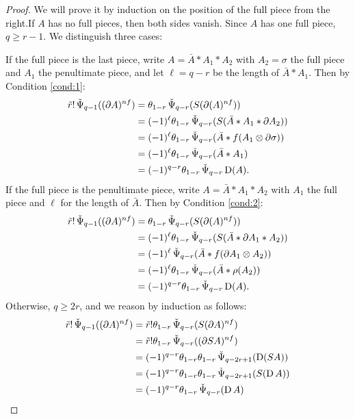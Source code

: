 \begin{proof}
	We will prove it by induction on the position of the full piece from the right.If $A$ has no full pieces, then both sides vanish. Since $A$ has one full piece, $q\geq r-1$. We distinguish three cases:

	If the full piece is the last piece, write $A=\bar{A}*A_1*A_2$ with $A_2 = \sigma$ the full piece and $A_1$ the penultimate piece, and let $\ell = q-r$ be the length of $\bar{A}*A_1$. Then by Condition \eqref{cond:1}:
	\begin{align*}
		\tilde{r}!\operatorname{\check{\Psi}}_{q-1}((\partial A)^{nf}) &=
		\theta_{1-r} \operatorname{\check{\Psi}}_{q-r}(S(\partial(A)^{nf})) \\
		&= (-1)^{\ell} \theta_{1-r}\operatorname{\check{\Psi}}_{q-r}(S(\bar{A}*A_1*\partial A_2)) \\
		&= (-1)^{\ell} \theta_{1-r}\operatorname{\check{\Psi}}_{q-r}(\bar{A}*f(A_1\otimes \partial \sigma)) \\
		&= (-1)^{\ell} \theta_{1-r}\operatorname{\check{\Psi}}_{q-r}(\bar{A}*A_1) \\
		&= (-1)^{q-r}\theta_{1-r}\operatorname{\check{\Psi}}_{q-r}\operatorname{D}(A).
	\end{align*}
	If the full piece is the penultimate piece, write $A=\bar{A}*A_1*A_2$ with $A_1$ the full piece and $\ell$ for the length of $\bar{A}$. Then by Condition \eqref{cond:2}:
	\begin{align*}
		\tilde{r}!\operatorname{\check{\Psi}}_{q-1}((\partial A)^{nf}) &=
		\theta_{1-r}\operatorname{\check{\Psi}}_{q-r}(S(\partial(A)^{nf})) \\
		&= (-1)^{\ell}\theta_{1-r}\operatorname{\check{\Psi}}_{q-r}(S(\bar{A}*\partial A_1* A_2)) \\
		&= (-1)^{\ell} \operatorname{\check{\Psi}}_{q-r}(\bar{A}*f(\partial A_1\otimes A_2)) \\
		&= (-1)^{\ell} \theta_{1-r}\operatorname{\check{\Psi}}_{q-r}(\bar{A}*\rho(A_2)) \\
		&= (-1)^{q-r}\theta_{1-r}\operatorname{\check{\Psi}}_{q-r}\operatorname{D}(A).
	\end{align*}
	Otherwise, $q\geq 2r$, and we reason by induction as follows: %
	\begin{align*}
		\tilde{r}!\operatorname{\check{\Psi}}_{q-1}((\partial A)^{nf})
		&= \tilde{r}!\theta_{1-r} \operatorname{\check{\Psi}}_{q-r}(S(\partial A)^{nf}) \\
		&= \tilde{r}!\theta_{1-r} \operatorname{\check{\Psi}}_{q-r}((\partial SA)^{nf}) \\
		&= (-1)^{q-r}\theta_{1-r}\theta_{1-r} \operatorname{\check{\Psi}}_{q-2r+1}(\operatorname{D} (SA)) \\
		&= (-1)^{q-r}\theta_{1-r}\theta_{1-r} \operatorname{\check{\Psi}}_{q-2r+1}(S(\operatorname{D} A)) \\
		&= (-1)^{q-r}\theta_{1-r} \operatorname{\check{\Psi}}_{q-r}(\operatorname{D} A)\qedhere
	\end{align*}
\end{proof}







